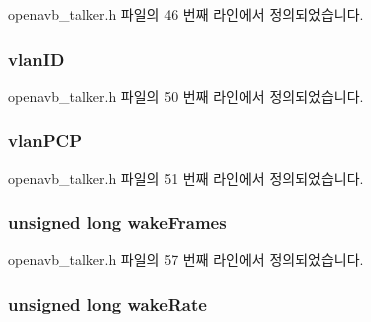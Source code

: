 openavb\+\_\+talker.\+h 파일의 46 번째 라인에서 정의되었습니다.

\subsubsection[{\texorpdfstring{vlan\+ID}{vlanID}}]{ vlan\+ID}\hypertarget{structtalker__data__t_a6f9e150f3345cb797072070d8972aec8}{}\label{structtalker__data__t_a6f9e150f3345cb797072070d8972aec8}


openavb\+\_\+talker.\+h 파일의 50 번째 라인에서 정의되었습니다.

\subsubsection[{\texorpdfstring{vlan\+P\+CP}{vlanPCP}}]{ vlan\+P\+CP}\hypertarget{structtalker__data__t_aeceb46fe9886e43a65d96da0339c43fb}{}\label{structtalker__data__t_aeceb46fe9886e43a65d96da0339c43fb}


openavb\+\_\+talker.\+h 파일의 51 번째 라인에서 정의되었습니다.

\subsubsection[{\texorpdfstring{wake\+Frames}{wakeFrames}}]{\setlength{\rightskip}{0pt plus 5cm}unsigned long wake\+Frames}\hypertarget{structtalker__data__t_a89864f8fd627d63b752a2edca16bda66}{}\label{structtalker__data__t_a89864f8fd627d63b752a2edca16bda66}


openavb\+\_\+talker.\+h 파일의 57 번째 라인에서 정의되었습니다.

\subsubsection[{\texorpdfstring{wake\+Rate}{wakeRate}}]{\setlength{\rightskip}{0pt plus 5cm}unsigned long wake\+Rate}\hypertarget{structtalker__data__t_adce972cc95f97beca374e38bea861870}{}\label{structtalker__data__t_adce972cc95f97beca374e38bea861870}


